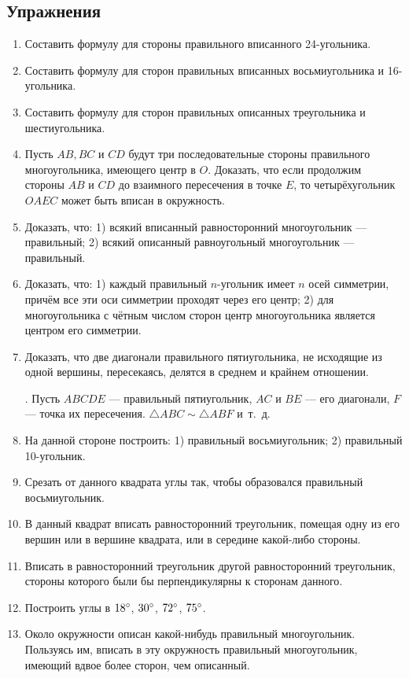 \subsection*{Упражнения}

\begin{enumerate}

\item
Составить формулу для стороны правильного вписанного 24-угольника.

\item
Составить формулу для сторон правильных вписанных восьмиугольника и 16-угольника.

\item
Составить формулу для сторон правильных описанных треугольника и шестиугольника.

\item
Пусть $AB, BC$ и $CD$ будут три последовательные стороны правильного многоугольника, имеющего центр в $O$.
Доказать, что если продолжим стороны $AB$ и $CD$ до взаимного пересечения в точке $E$, то четырёхугольник $OAEC$ может быть вписан в окружность.

\item
Доказать, что:
1) всякий вписанный равносторонний многоугольник — правильный;
2) всякий описанный равноугольный многоугольник — правильный.

\item
Доказать, что:
1) каждый правильный $n$-угольник имеет $n$ осей симметрии, причём все эти оси симметрии проходят через его центр;
2) для многоугольника с чётным числом сторон центр многоугольника является центром его симметрии.

\item
Доказать, что две диагонали правильного пятиугольника, не исходящие из одной вершины, пересекаясь, делятся в среднем и крайнем отношении.

\smallskip
{}.
Пусть $ABCDE$ — правильный пятиугольник, $AC$ и $BE$ — его диагонали, $F$ — точка их пересечения.
$\triangle ABC \sim \triangle ABF$ и~т.~д.

\item
На данной стороне построить:
1) правильный восьмиугольник;
2) правильный 10-угольник.

\item
Срезать от данного квадрата углы так, чтобы образовался правильный восьмиугольник.

\item
В данный квадрат вписать равносторонний треугольник, помещая одну из его вершин или в вершине квадрата, или в середине какой-либо стороны.

\item
Вписать в равносторонний треугольник другой равносторонний треугольник, стороны которого были бы перпендикулярны к сторонам данного.

\item
Построить углы в $18\degree$, $30\degree$, $72\degree$, $75\degree$.

\item
Около окружности описан какой-нибудь правильный многоугольник.
Пользуясь им, вписать в эту окружность правильный многоугольник, имеющий вдвое более сторон, чем описанный.

\end{enumerate}